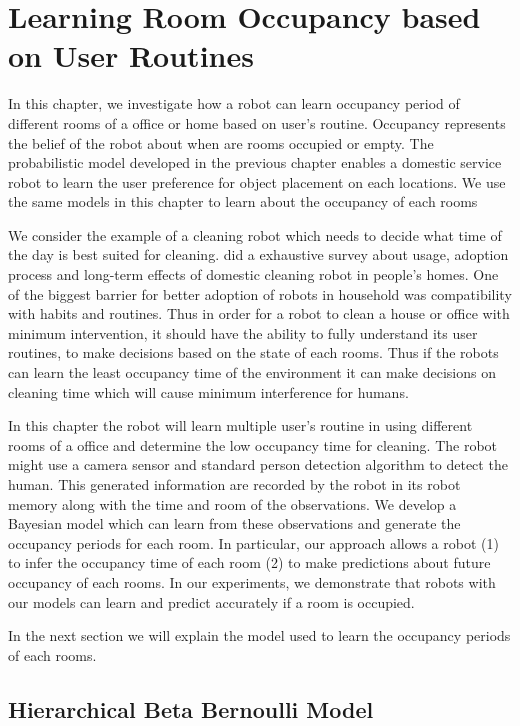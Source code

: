 \chapter{Learning Room Occupancy based on User Routines}
\label{chapter:occupancy}
In this chapter, we investigate how a robot can learn occupancy period of different rooms of a office or home based on user's routine. Occupancy represents the belief of the robot about when are rooms occupied or empty. The probabilistic model developed in the previous chapter enables a domestic service robot to learn the user preference for object placement on each locations. We use the same models in this chapter to learn about the occupancy of each rooms

We consider the example of a cleaning robot which needs to decide what time of the day is best suited for cleaning. \cite{Fink2013} did a exhaustive survey about usage, adoption process and long-term effects of domestic cleaning robot in people's homes. One of the biggest barrier for better adoption of robots in household was compatibility with habits and routines. Thus in order for a robot to clean a house or office with minimum intervention, it should have the ability to fully understand its user routines, to make decisions based on the state of each rooms. Thus if the robots can learn the  least occupancy time of the environment it can make decisions on cleaning time which will cause minimum interference for humans. 


In this chapter the robot will learn multiple user's routine in using different rooms of a office and determine the low occupancy time for cleaning.
The robot might use a camera sensor and standard person detection algorithm to detect the human. This generated information are recorded by the robot in its robot memory along with the time and room of the observations. We develop a Bayesian model which can learn from these observations and generate the occupancy periods for each room. In particular, our approach allows a robot (1) to infer the occupancy time of each room (2) to make predictions about future occupancy of each rooms. In our experiments, we demonstrate that robots with our models can learn and predict accurately if a room is occupied.

In the next section we will explain the model used to learn the occupancy periods of each rooms. 

\section{Hierarchical Beta Bernoulli Model}

